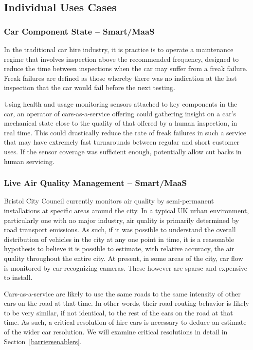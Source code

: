 \documentclass[journal]{IEEEtran}
\begin{document}
\subsection{Individual Uses Cases}

\subsubsection{Car Component State -- Smart/MaaS}

In the traditional car hire industry, it is practice is to operate a
maintenance regime that involves inspection above the recommended
frequency, designed to reduce the time between inspections when the
car may suffer from a freak failure. Freak failures are defined as
those whereby there was no indication at the last inspection that the
car would fail before the next testing.

Using health and usage monitoring sensors attached to key components
in the car, an operator of cars-as-a-service offering could gathering
insight on a car's mechanical state close to the quality of that
offered by a human inspection, in real time. This could drastically
reduce the rate of freak failures in such a service that may have
extremely fast turnarounds between regular and short customer uses. If
the sensor coverage was sufficient enough, potentially allow cut backs
in human servicing.

\subsubsection{Live Air Quality Management -- Smart/MaaS}

Bristol City Council currently monitors air quality by semi-permanent
installations at specific areas around the city. In a typical UK urban
environment, particularly one with no major industry, air quality is
primarily determined by road transport emissions. As such, if it was
possible to understand the overall distribution of vehicles in the
city at any one point in time, it is a reasonable hypothesis to
believe it is possible to estimate, with relative accuracy, the air
quality throughout the entire city. At present, in some areas of the
city, car flow is monitored by car-recognizing cameras. These however
are sparse and expensive to install.

Cars-as-a-service are likely to use the same roads to the same
intensity of other cars on the road at that time. In other words,
their road routing behavior is likely to be very similar, if not
identical, to the rest of the cars on the road at that time. As such,
a critical resolution of hire cars is necessary to deduce an estimate
of the wider car resolution. We will examine critical resolutions in
detail in Section~\ref{barriersenablers}.
\end{document}
